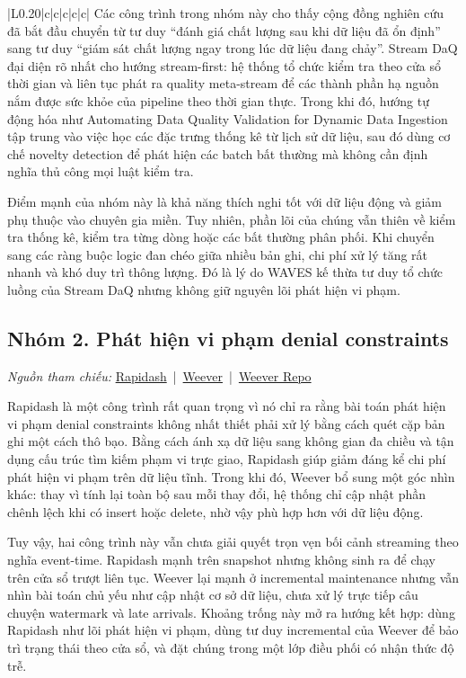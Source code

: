 {\begin{longtable}{|L{0.20\textwidth}|c|c|c|c|c|}
Các công trình trong nhóm này cho thấy cộng đồng nghiên cứu đã bắt đầu chuyển từ tư duy ``đánh giá chất lượng sau khi dữ liệu đã ổn định'' sang tư duy ``giám sát chất lượng ngay trong lúc dữ liệu đang chảy''. Stream DaQ đại diện rõ nhất cho hướng stream-first: hệ thống tổ chức kiểm tra theo cửa sổ thời gian và liên tục phát ra quality meta-stream để các thành phần hạ nguồn nắm được sức khỏe của pipeline theo thời gian thực. Trong khi đó, hướng tự động hóa như Automating Data Quality Validation for Dynamic Data Ingestion tập trung vào việc học các đặc trưng thống kê từ lịch sử dữ liệu, sau đó dùng cơ chế novelty detection để phát hiện các batch bất thường mà không cần định nghĩa thủ công mọi luật kiểm tra.

Điểm mạnh của nhóm này là khả năng thích nghi tốt với dữ liệu động và giảm phụ thuộc vào chuyên gia miền. Tuy nhiên, phần lõi của chúng vẫn thiên về kiểm tra thống kê, kiểm tra từng dòng hoặc các bất thường phân phối. Khi chuyển sang các ràng buộc logic đan chéo giữa nhiều bản ghi, chi phí xử lý tăng rất nhanh và khó duy trì thông lượng. Đó là lý do WAVES kế thừa tư duy tổ chức luồng của Stream DaQ nhưng không giữ nguyên lõi phát hiện vi phạm.

\subsection*{Nhóm 2. Phát hiện vi phạm denial constraints}

\noindent \textit{Nguồn tham chiếu: }
\href{https://dl.acm.org/doi/10.14778/3659437.3659454}{Rapidash} \,|\, \href{https://dl.acm.org/doi/10.14778/3717755.3717761}{Weever} \,|\, \href{https://github.com/HPI-Information-Systems/Weever}{Weever Repo}

Rapidash là một công trình rất quan trọng vì nó chỉ ra rằng bài toán phát hiện vi phạm denial constraints không nhất thiết phải xử lý bằng cách quét cặp bản ghi một cách thô bạo. Bằng cách ánh xạ dữ liệu sang không gian đa chiều và tận dụng cấu trúc tìm kiếm phạm vi trực giao, Rapidash giúp giảm đáng kể chi phí phát hiện vi phạm trên dữ liệu tĩnh. Trong khi đó, Weever bổ sung một góc nhìn khác: thay vì tính lại toàn bộ sau mỗi thay đổi, hệ thống chỉ cập nhật phần chênh lệch khi có insert hoặc delete, nhờ vậy phù hợp hơn với dữ liệu động.

Tuy vậy, hai công trình này vẫn chưa giải quyết trọn vẹn bối cảnh streaming theo nghĩa event-time. Rapidash mạnh trên snapshot nhưng không sinh ra để chạy trên cửa sổ trượt liên tục. Weever lại mạnh ở incremental maintenance nhưng vẫn nhìn bài toán chủ yếu như cập nhật cơ sở dữ liệu, chưa xử lý trực tiếp câu chuyện watermark và late arrivals. Khoảng trống này mở ra hướng kết hợp: dùng Rapidash như lõi phát hiện vi phạm, dùng tư duy incremental của Weever để bảo trì trạng thái theo cửa sổ, và đặt chúng trong một lớp điều phối có nhận thức độ trễ.


\end{longtable}}
